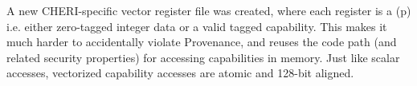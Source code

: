 \documentclass[../thesis]{subfiles}
\begin{document}
A new CHERI-specific vector register file was created, where each register is a  (p\pageref{safetaggedcap}) i.e. either zero-tagged integer data or a valid tagged capability.
This makes it much harder to accidentally violate Provenance, and reuses the code path (and related security properties) for accessing capabilities in memory.
Just like scalar accesses, vectorized capability accesses are atomic and 128-bit aligned.




\end{document}
